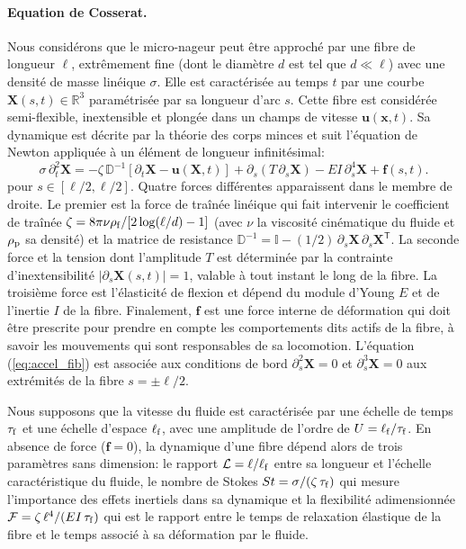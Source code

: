\documentclass[a4paper,11pt]{article}
\begin{document}
\paragraph{Equation de Cosserat.} Nous considérons que le micro-nageur peut être approché par une fibre de longueur $\ell$, extrêmement fine (dont le diamètre $d$ est tel que $d\ll\ell$)  avec une densité de masse linéique $\sigma$. Elle est caractérisée au temps $t$ par une courbe $\bm X(s,t)\in\mathbb{R}^3$ paramétrisée par sa longueur d'arc $s$.  Cette fibre est considérée semi-flexible, inextensible et plongée dans un champs de vitesse $\bm u(\bm x,t)$.  Sa dynamique est décrite par la théorie des corps minces  et suit l'équation de Newton appliquée à un élément de longueur infinitésimal:
\begin{equation}
  \sigma\,\partial_t ^2 \bm X = -\zeta\,\mathbb{D}^{-1} \left[\partial_t \bm X - \bm u(\bm X,t) \right] + \partial_s(T\,\partial_s \bm X) - EI\,\partial_s^4 \bm X + \bm f(s,t).
  \label{eq:accel_fib}
\end{equation}
pour $s\in[\ell/2,\ell/2]$.  Quatre forces différentes apparaissent dans le membre de droite. Le premier est la force de traînée linéique qui fait intervenir le coefficient de traînée $\zeta = 8\pi\nu\rho_{\rm f}/[2\log(\ell/d)-1]$ (avec $\nu$ la viscosité cinématique du fluide et $\rho_{\rm p}$ sa densité) et la matrice de resistance $\mathbb{D}^{-1}  = \mathbb{I} -(1/2)\, \partial_s\bm X\,\partial_s\bm X^{\mathsf{T}}$. La seconde force et la tension dont l'amplitude $T$ est déterminée par la contrainte d'inextensibilité $|\partial_s\bm X(s,t)| = 1$, valable à tout instant le long de la fibre. La troisième force est l'élasticité de flexion et dépend du module d'Young $E$ et de l'inertie $I$ de la fibre. Finalement, $\bm f$ est une force interne de déformation qui doit être prescrite pour prendre en compte les comportements dits actifs de la fibre, à savoir les mouvements qui sont responsables de sa locomotion. L'équation (\ref{eq:accel_fib}) est associée aux conditions de bord $\partial_s^2\bm X=0$ et $\partial_s^3\bm X=0$ aux extrémités de la fibre $s = \pm\ell/2$.

Nous supposons que la vitesse du fluide est caractérisée par une échelle de temps $\tau_{\rm f}$ et une échelle d'espace $\ell_{\rm f}$, avec une amplitude de l'ordre de $U = \ell_{\rm f}/\tau_{\rm f}$.  En absence de force ($\bm f =0$), la dynamique d'une fibre dépend alors de trois paramètres sans dimension: le rapport $\mathcal{L} = \ell/\ell_{\rm f}$ entre sa longueur et l'échelle caractéristique du fluide, le nombre de Stokes $St = \sigma/(\zeta\,\tau_{\rm f})$ qui mesure l'importance des effets inertiels dans sa dynamique et la flexibilité adimensionnée $\mathcal{F} = \zeta\,\ell^4/(EI\,\tau_{\rm f})$ qui est le rapport entre le temps de relaxation élastique de la fibre et le temps associé à sa déformation par le fluide.
\end{document}
